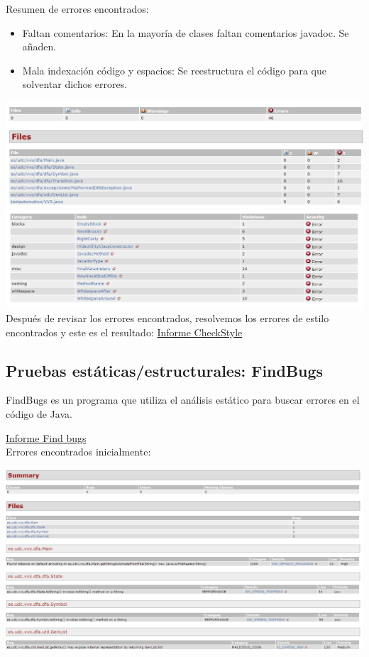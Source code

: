 \documentclass[DIV=calc,paper=a4,fontsize=11pt,onecolumn]{scrartcl} %
\begin{document}
	Resumen de errores encontrados:
	\begin{itemize}
		\item Faltan comentarios: En la mayoría de clases faltan comentarios javadoc. Se añaden.
		\item Mala indexación código y espacios: Se reestructura el código para que solventar dichos errores.
	\end{itemize}
	\includegraphics[width=15cm]{Imagenes/erroresCheckStyle.png} \\
	\includegraphics[width=15cm]{Imagenes/checkStyleErrores.png} \\
	Después de revisar los errores encontrados, resolvemos los errores de estilo encontrados y este es el resultado:
	  \href{Informes/checkStyle-report/checkstyle.html}{Informe CheckStyle} \\

	\subsection{Pruebas estáticas/estructurales: FindBugs}
	
	FindBugs es un programa que utiliza el análisis estático para buscar errores en el código de Java.
	
	\href{Informes/findBugs-report/findbugs.html}{Informe Find bugs} \\
	
	Errores encontrados inicialmente:
	
	\includegraphics[width=15cm]{Imagenes/findBugs1.png} \\
	
\end{document}
